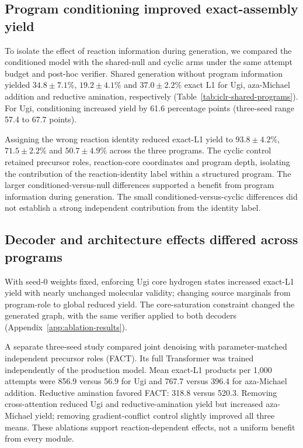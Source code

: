 \documentclass{article}
\theoremstyle{definition}
\newcommand{\ForgeTableOneCyclicBLYield}{$71.5\pm2.2$}
\newcommand{\ForgeTableOneCyclicLXYield}{$50.7\pm4.9$}
\newcommand{\ForgeTableOneCyclicUgiYield}{$93.8\pm4.2$}
\newcommand{\ForgeTableOneNullBLYield}{$19.2\pm4.1$}
\newcommand{\ForgeTableOneNullLXYield}{$37.0\pm2.2$}
\newcommand{\ForgeTableOneNullUgiDifferencePP}{61.6}
\newcommand{\ForgeTableOneNullUgiRangeHighPP}{67.7}
\newcommand{\ForgeTableOneNullUgiRangeLowPP}{57.4}
\newcommand{\ForgeTableOneNullUgiYield}{$34.8\pm7.1$}
\newcommand{\ForgeProseMechanismFactMatchedBL}{396.4}
\newcommand{\ForgeProseMechanismFactMatchedLX}{520.3}
\newcommand{\ForgeProseMechanismFactMatchedUgi}{56.9}
\newcommand{\ForgeProseMechanismFullBL}{767.7}
\newcommand{\ForgeProseMechanismFullLX}{318.8}
\newcommand{\ForgeProseMechanismFullUgi}{856.9}
\begin{document}
\subsection{Program conditioning improved exact-assembly yield}
To isolate the effect of reaction information during generation, we compared the conditioned
model with the shared-null and cyclic arms under the same attempt budget and post-hoc verifier.
Shared generation without program information yielded \ForgeTableOneNullUgiYield\%,
\ForgeTableOneNullBLYield\% and \ForgeTableOneNullLXYield\% exact L1 for Ugi, aza-Michael addition
and reductive amination, respectively (Table~\ref{tab:iclr-shared-programs}). For Ugi, conditioning
increased yield by \ForgeTableOneNullUgiDifferencePP{} percentage points (three-seed range
\ForgeTableOneNullUgiRangeLowPP{} to \ForgeTableOneNullUgiRangeHighPP{} points).

Assigning the wrong reaction identity reduced exact-L1 yield to
\ForgeTableOneCyclicUgiYield\%, \ForgeTableOneCyclicBLYield\% and
\ForgeTableOneCyclicLXYield\% across the three programs. The cyclic control retained precursor roles, reaction-core
coordinates and program depth, isolating the contribution of the reaction-identity label within a
structured program. The larger conditioned-versus-null differences supported a benefit from program
information during generation. The small conditioned-versus-cyclic differences did not establish
a strong independent contribution from the identity label.

\subsection{Decoder and architecture effects differed across programs}
With seed-0 weights fixed, enforcing Ugi core hydrogen states increased exact-L1 yield with nearly
unchanged molecular validity; changing source marginals from program-role to global reduced yield.
The core-saturation constraint changed the generated graph, with the same verifier applied to both
decoders (Appendix~\ref{app:ablation-results}).

A separate three-seed study compared joint denoising with parameter-matched independent precursor
roles (FACT). Its full Transformer was trained independently of the production model. Mean exact-L1
products per 1,000 attempts were \ForgeProseMechanismFullUgi{} versus
\ForgeProseMechanismFactMatchedUgi{} for Ugi and \ForgeProseMechanismFullBL{} versus
\ForgeProseMechanismFactMatchedBL{} for aza-Michael addition. Reductive amination favored FACT:
\ForgeProseMechanismFullLX{} versus \ForgeProseMechanismFactMatchedLX{}. Removing cross-attention reduced Ugi and reductive-amination yield but
increased aza-Michael yield; removing gradient-conflict control slightly improved all three means.
These ablations support reaction-dependent effects, not a uniform benefit from every module.
\end{document}
